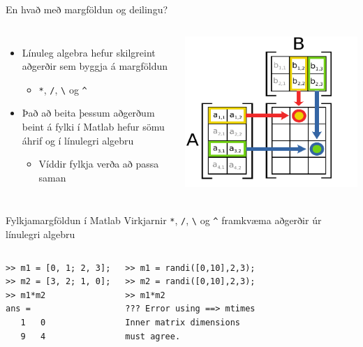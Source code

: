 \documentclass[handout]{beamer}
\begin{document}
\begin{frame}{En hvað með margföldun og deilingu?}
\pause
\begin{columns}
\begin{itemize}
 \item Línuleg algebra hefur skilgreint aðgerðir sem byggja á margföldun
 \begin{itemize}
  \item \texttt{*}, \texttt{/}, \texttt{\textbackslash} og \texttt{\^}
 \end{itemize}
 \item Það að beita þessum aðgerðum beint á fylki í Matlab hefur sömu áhrif og í línulegri algebru
 \begin{itemize}
  \item Víddir fylkja verða að passa saman
 \end{itemize}
\end{itemize}

\includegraphics[width=\linewidth]{Pics/matrix-multiplication}
\end{columns}
\end{frame}

\begin{frame}[fragile]{Fylkjamargföldun í Matlab}
Virkjarnir \texttt{*}, \texttt{/}, \texttt{\textbackslash} og \texttt{\^} framkvæma aðgerðir úr línulegri algebru
\begin{columns}
\begin{verbatim}
>> m1 = [0, 1; 2, 3];
>> m2 = [3, 2; 1, 0];
>> m1*m2
ans =
   1   0
   9   4
\end{verbatim}
\begin{verbatim}
>> m1 = randi([0,10],2,3);
>> m2 = randi([0,10],2,3);
>> m1*m2
??? Error using ==> mtimes
Inner matrix dimensions 
must agree.
\end{verbatim}
\end{columns}
\end{frame}
\end{document}
